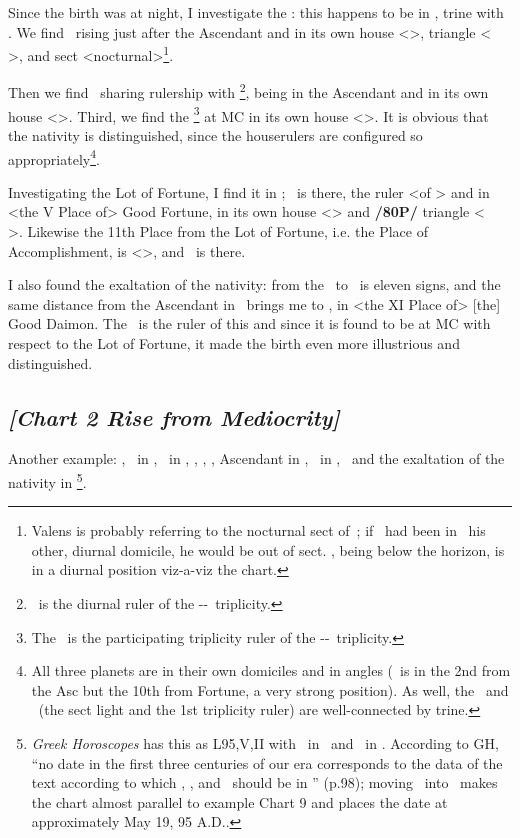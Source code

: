 Since the birth was at night, I investigate the \Moon: this
happens to be in \Cancer, trine with \Mars. We find \Mars\, rising just after the Ascendant and in its own
house <\Scorpio>, triangle <\Scorpio\,\Pisces\, \Cancer>, and sect <nocturnal>\footnote{Valens is probably referring to the nocturnal sect of \Scorpio\,; if \Mars\, had been in \Aries\, his other, diurnal domicile, he would be out of sect. \Mars, being below the horizon, is in a diurnal position viz-a-viz the chart.}. 

Then we find \Venus\, sharing rulership with \Mars\footnote{\Venus\, is the diurnal ruler of the \Cancer-\Scorpio-\Pisces\, triplicity.}, being in the Ascendant and in its own house <\Libra>. Third, we find the \Moon\footnote{The \Moon\, is the participating triplicity ruler of the \Cancer-\Scorpio-\Pisces\, triplicity.} at MC in its own house <\Cancer>. It is obvious that the nativity is distinguished, since the houserulers are configured so appropriately\footnote{All three planets are in their own domiciles and in angles (\Mars\, is in the 2nd from the Asc but the 10th from Fortune, a very strong position). As well, the \Moon\, and \Mars\, (the sect light and the 1st triplicity ruler) are well-connected by trine.}. 

Investigating the Lot of Fortune, I find it in \Aquarius; \Saturn\, is there, the ruler <of \Aquarius> and in <the V Place of> Good Fortune, in its own house <\Aquarius> and \textbf{/80P/} triangle <\Aquarius\, \Libra\, \Gemini>. Likewise the 11th Place from the Lot of Fortune, i.e. the Place of Accomplishment, is <\Sagittarius>, and \Jupiter\, is there.

I also found the exaltation of the nativity: from the \Moon\, to \Taurus\, is eleven signs, and the same distance from the Ascendant in \Libra\, brings me to \Leo, in <the XI Place of> [the] Good Daimon. The \Sun\, is the ruler of this and since it is found to be at MC with respect to the Lot of Fortune, it made the birth even more illustrious and distinguished.
\newpage
\subsection*{\textit{[Chart 2 Rise from Mediocrity]}}

Another example: \Sun, \Mercury\, in \Taurus, \Moon\, in \Aries, \Saturn, \Mars, \Venus, Ascendant in \Cancer,
\Jupiter\, in \Capricorn, \Fortune\, and the exaltation of the nativity in \Gemini
\footnote{\textit{Greek Horoscopes} has this as L95,V,II with \Saturn\, in \Leo\, and \Jupiter\, in \Virgo. According to GH, ``no date in the first three centuries of our era corresponds to the data of the text according to which \Saturn, \Mars, and \Venus\, should be in \Cancer'' (p.98); moving \Saturn\, into \Leo\, makes the chart almost parallel to example Chart 9 and places the date at approximately May 19, 95 A.D..}.

